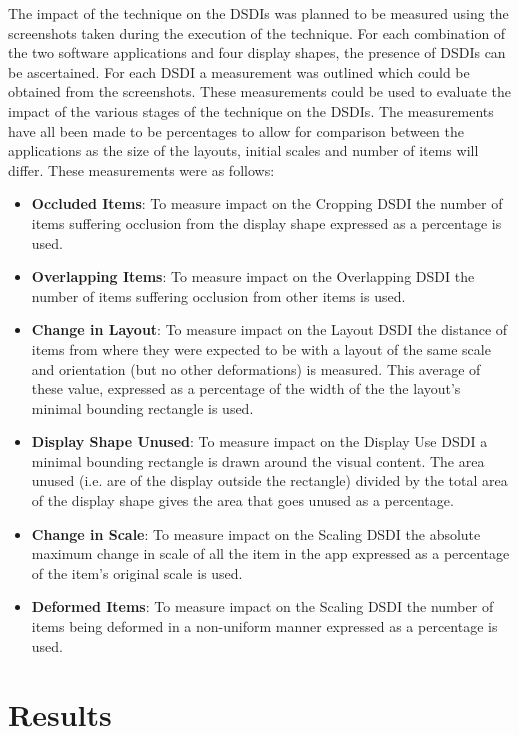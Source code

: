 \documentclass[twocolumn,compsoc]{cvm}
\begin{document}
{The impact of the technique on the \acp{DSDI} was planned to be measured using the screenshots taken during the execution of the technique.
For each combination of the two software applications and four display shapes, the presence of \acp{DSDI} can be ascertained.
For each \ac{DSDI} a measurement was outlined which could be obtained from the screenshots.
These measurements could be used to evaluate the impact of the various stages of the technique on the \acp{DSDI}.
The measurements have all been made to be percentages to allow for comparison between the applications as the size of the layouts, initial scales and number of items will differ.
These measurements were as follows:
\begin{itemize}
  \item \textbf{Occluded Items}: 
  To measure impact on the Cropping \ac{DSDI} the number of items suffering occlusion from the display shape expressed as a percentage is used.
  \item \textbf{Overlapping Items}: 
  To measure impact on the Overlapping \ac{DSDI} the number of items suffering occlusion from other items is used.  
  \item \textbf{Change in Layout}: 
  To measure impact on the Layout \ac{DSDI} the distance of items from where they were expected to be with a layout of the same scale and orientation (but no other deformations) is measured.
  This average of these value, expressed as a percentage of the width of the the layout's minimal bounding rectangle is used.
  \item \textbf{Display Shape Unused}: 
  To measure impact on the Display Use \ac{DSDI} a minimal bounding rectangle is drawn around the visual content.
  The area unused (i.e. are of the display outside the rectangle) divided by the total area of the display shape gives the area that goes unused as a percentage.
  \item \textbf{Change in Scale}: 
  To measure impact on the Scaling \ac{DSDI} the absolute maximum change in scale of all the item in the app expressed as a percentage of the item's original scale is used.
  \item \textbf{Deformed Items}: 
  To measure impact on the Scaling \ac{DSDI}  the number of items being deformed in a non-uniform manner expressed as a percentage is used.
\end{itemize}


\section{Results}
\label{sec:results}


}
\end{document}
